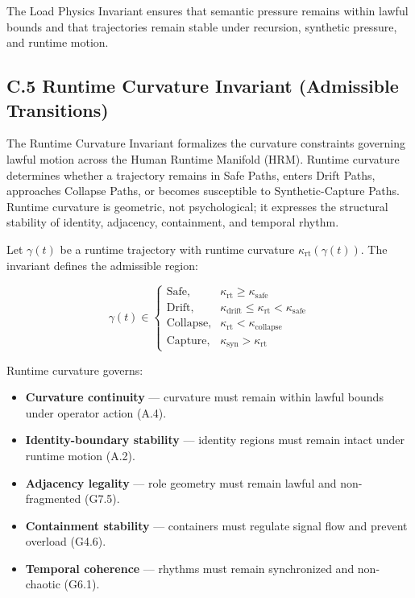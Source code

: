\medskip

\noindent The Load Physics Invariant ensures that semantic pressure remains
within lawful bounds and that trajectories remain stable under recursion,
synthetic pressure, and runtime motion.



\subsection*{C.5 Runtime Curvature Invariant (Admissible Transitions)}

\noindent The Runtime Curvature Invariant formalizes the curvature constraints
governing lawful motion across the Human Runtime Manifold (HRM). Runtime
curvature determines whether a trajectory remains in Safe Paths, enters Drift
Paths, approaches Collapse Paths, or becomes susceptible to Synthetic-Capture
Paths. Runtime curvature is geometric, not psychological; it expresses the
structural stability of identity, adjacency, containment, and temporal rhythm.

\medskip

\noindent Let $\gamma(t)$ be a runtime trajectory with runtime curvature
$\kappa_{\mathrm{rt}}(\gamma(t))$. The invariant defines the admissible region:



\[
\gamma(t) \in
\begin{cases}
\text{Safe}, & \kappa_{\mathrm{rt}} \ge \kappa_{\mathrm{safe}} \\
\text{Drift}, & \kappa_{\mathrm{drift}} \le \kappa_{\mathrm{rt}} < \kappa_{\mathrm{safe}} \\
\text{Collapse}, & \kappa_{\mathrm{rt}} < \kappa_{\mathrm{collapse}} \\
\text{Capture}, & \kappa_{\mathrm{syn}} > \kappa_{\mathrm{rt}}
\end{cases}
\]



\medskip

\noindent Runtime curvature governs:

\begin{itemize}
    \item \textbf{Curvature continuity} — curvature must remain within lawful
    bounds under operator action (A.4).

    \item \textbf{Identity-boundary stability} — identity regions must remain
    intact under runtime motion (A.2).

    \item \textbf{Adjacency legality} — role geometry must remain lawful and
    non-fragmented (G7.5).

    \item \textbf{Containment stability} — containers must regulate signal flow
    and prevent overload (G4.6).

    \item \textbf{Temporal coherence} — rhythms must remain synchronized and
    non-chaotic (G6.1).
\end{itemize}

